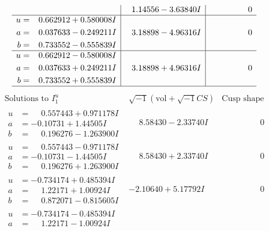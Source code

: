 \documentclass[1p]{elsarticle_modified}
\theoremstyle{definition}
\newcommand{\I}{\sqrt{-1}}
\begin{document}
$$\begin{array}{c|c|c}
 & \phantom{-}1.14556 - 3.63840 I & \phantom{-0.000000 } 0 \\ \hline\begin{aligned}
u &= \phantom{-}0.662912 + 0.580008 I \\
a &= \phantom{-}0.037633 - 0.249211 I \\
b &= \phantom{-}0.733552 - 0.555839 I\end{aligned}
 & \phantom{-}3.18898 - 4.96316 I & \phantom{-0.000000 } 0 \\ \hline\begin{aligned}
u &= \phantom{-}0.662912 - 0.580008 I \\
a &= \phantom{-}0.037633 + 0.249211 I \\
b &= \phantom{-}0.733552 + 0.555839 I\end{aligned}
 & \phantom{-}3.18898 + 4.96316 I & \phantom{-0.000000 } 0\\
 \hline 
 \end{array}$$\newpage$$\begin{array}{c|c|c}  
\text{Solutions to }I^u_{1}& \I (\text{vol} + \sqrt{-1}CS) & \text{Cusp shape}\\
 \hline 
\begin{aligned}
u &= \phantom{-}0.557443 + 0.971178 I \\
a &= -0.10731 + 1.44505 I \\
b &= \phantom{-}0.196276 - 1.263900 I\end{aligned}
 & \phantom{-}8.58430 - 2.33740 I & \phantom{-0.000000 } 0 \\ \hline\begin{aligned}
u &= \phantom{-}0.557443 - 0.971178 I \\
a &= -0.10731 - 1.44505 I \\
b &= \phantom{-}0.196276 + 1.263900 I\end{aligned}
 & \phantom{-}8.58430 + 2.33740 I & \phantom{-0.000000 } 0 \\ \hline\begin{aligned}
u &= -0.734174 + 0.485394 I \\
a &= \phantom{-}1.22171 + 1.00924 I \\
b &= \phantom{-}0.872071 - 0.815605 I\end{aligned}
 & -2.10640 + 5.17792 I & \phantom{-0.000000 } 0 \\ \hline\begin{aligned}
u &= -0.734174 - 0.485394 I \\
a &= \phantom{-}1.22171 - 1.00924 I \\

\end{aligned}
\end{array}$$
\end{document}
